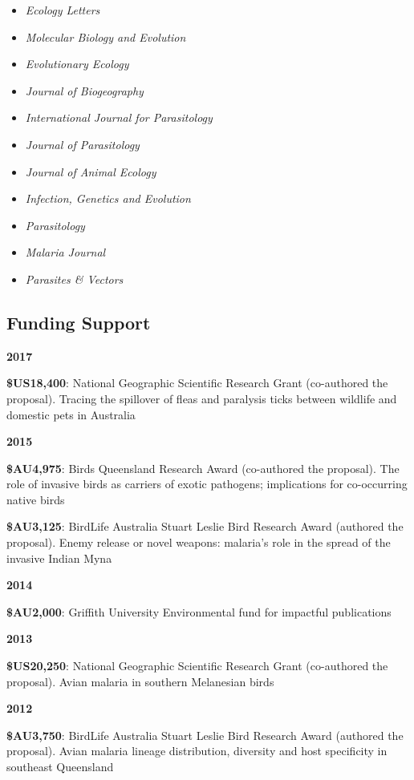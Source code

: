 \documentclass[]{article}
\providecommand{\tightlist}{%
  \setlength{\itemsep}{0pt}\setlength{\parskip}{0pt}}
\begin{document}
\begin{itemize}
\tightlist
\item
  \emph{Ecology Letters}
\item
  \emph{Molecular Biology and Evolution}
\item
  \emph{Evolutionary Ecology}
\item
  \emph{Journal of Biogeography}
\item
  \emph{International Journal for Parasitology}
\item
  \emph{Journal of Parasitology}
\item
  \emph{Journal of Animal Ecology}
\item
  \emph{Infection, Genetics and Evolution}
\item
  \emph{Parasitology}
\item
  \emph{Malaria Journal}
\item
  \emph{Parasites \& Vectors}
\end{itemize}

\subsection{Funding Support}\label{funding-support}

\textbf{2017}

\textbf{\$US18,400}: National Geographic Scientific Research Grant
(co-authored the proposal). Tracing the spillover of fleas and paralysis
ticks between wildlife and domestic pets in Australia

\textbf{2015}

\textbf{\$AU4,975}: Birds Queensland Research Award (co-authored the
proposal). The role of invasive birds as carriers of exotic pathogens;
implications for co-occurring native birds

\textbf{\$AU3,125}: BirdLife Australia Stuart Leslie Bird Research Award
(authored the proposal). Enemy release or novel weapons: malaria's role
in the spread of the invasive Indian Myna

\textbf{2014}

\textbf{\$AU2,000}: Griffith University Environmental fund for impactful
publications

\textbf{2013}

\textbf{\$US20,250}: National Geographic Scientific Research Grant
(co-authored the proposal). Avian malaria in southern Melanesian birds

\textbf{2012}

\textbf{\$AU3,750}: BirdLife Australia Stuart Leslie Bird Research Award
(authored the proposal). Avian malaria lineage distribution, diversity
and host specificity in southeast Queensland
\end{document}
